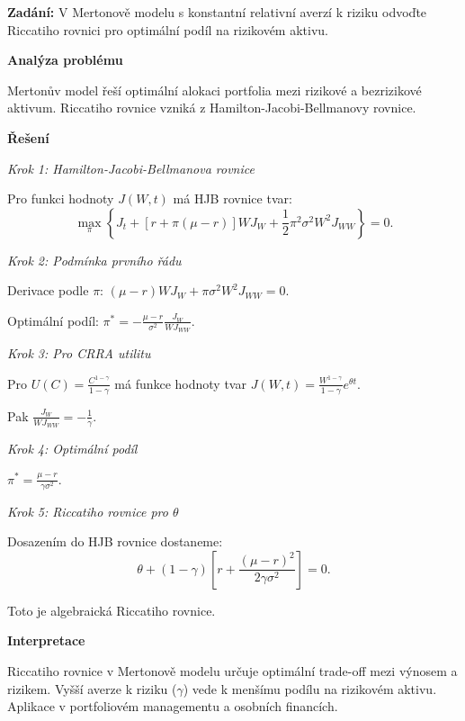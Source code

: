 \begin{example}
\label{ex:c2-stredni-merton}

\noindent\textbf{Zadání:} V Mertonově modelu s konstantní relativní averzí k riziku odvoďte Riccatiho rovnici pro optimální podíl na rizikovém aktivu.

\vspace{1.5\baselineskip}

\noindent\textbf{Analýza problému}

\noindent Mertonův model řeší optimální alokaci portfolia mezi rizikové a bezrizikové aktivum. Riccatiho rovnice vzniká z Hamilton-Jacobi-Bellmanovy rovnice.

\vspace{1.5\baselineskip}

\noindent\textbf{Řešení}

\noindent\textit{Krok 1: Hamilton-Jacobi-Bellmanova rovnice}

Pro funkci hodnoty $J(W,t)$ má HJB rovnice tvar:
\[
\max_{\pi} \left\{ J_t + [r + \pi(\mu - r)]WJ_W + \frac{1}{2}\pi^2\sigma^2W^2J_{WW} \right\} = 0.
\]

\noindent\textit{Krok 2: Podmínka prvního řádu}

Derivace podle $\pi$: $(\mu - r)WJ_W + \pi\sigma^2W^2J_{WW} = 0$.

Optimální podíl: $\pi^* = -\frac{\mu - r}{\sigma^2}\frac{J_W}{WJ_{WW}}$.

\noindent\textit{Krok 3: Pro CRRA utilitu}

Pro $U(C) = \frac{C^{1-\gamma}}{1-\gamma}$ má funkce hodnoty tvar $J(W,t) = \frac{W^{1-\gamma}}{1-\gamma}e^{\theta t}$.

Pak $\frac{J_W}{WJ_{WW}} = -\frac{1}{\gamma}$.

\noindent\textit{Krok 4: Optimální podíl}

$\pi^* = \frac{\mu - r}{\gamma\sigma^2}$.

\noindent\textit{Krok 5: Riccatiho rovnice pro $\theta$}

Dosazením do HJB rovnice dostaneme:
\[
\theta + (1-\gamma)\left[r + \frac{(\mu - r)^2}{2\gamma\sigma^2}\right] = 0.
\]

Toto je algebraická Riccatiho rovnice.

\vspace{1.5\baselineskip}

\noindent\textbf{Interpretace}

Riccatiho rovnice v Mertonově modelu určuje optimální trade-off mezi výnosem a rizikem. 
Vyšší averze k riziku ($\gamma$) vede k menšímu podílu na rizikovém aktivu. 
Aplikace v portfoliovém managementu a osobních financích.

\end{example}

